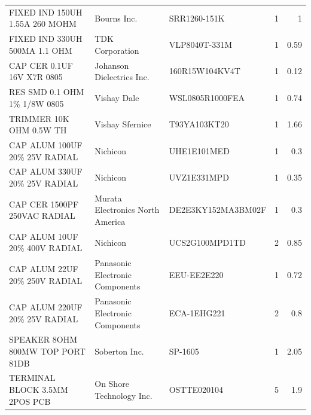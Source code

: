 \documentclass[journal,compsoc]{IEEEtran}
\begin{document}
\begin{table}[]
\begin{tabular}{|rrr|r|r|}
    \multicolumn{1}{|l}{FIXED IND 150UH 1.55A 260 MOHM} & \multicolumn{1}{l}{Bourns Inc.} & \multicolumn{1}{l}{SRR1260-151K} & \multicolumn{1}{r}{1} & 1 \\
    \multicolumn{1}{|l}{FIXED IND 330UH 500MA 1.1 OHM} & \multicolumn{1}{l}{TDK Corporation} & \multicolumn{1}{l}{VLP8040T-331M} & \multicolumn{1}{r}{1} & 0.59 \\
    \multicolumn{1}{|l}{CAP CER 0.1UF 16V X7R 0805} & \multicolumn{1}{l}{Johanson Dielectrics Inc.} & \multicolumn{1}{l}{160R15W104KV4T} & \multicolumn{1}{r}{1} & 0.12 \\
    \multicolumn{1}{|l}{RES SMD 0.1 OHM 1\% 1/8W 0805} & \multicolumn{1}{l}{ 
Vishay Dale} & \multicolumn{1}{l}{WSL0805R1000FEA} & \multicolumn{1}{r}{1} & 0.74 \\
    \multicolumn{1}{|l}{TRIMMER 10K OHM 0.5W TH} & \multicolumn{1}{l}{Vishay Sfernice} & \multicolumn{1}{l}{T93YA103KT20} & \multicolumn{1}{r}{1} & 1.66 \\
    \multicolumn{1}{|l}{CAP ALUM 100UF 20\% 25V RADIAL} & \multicolumn{1}{l}{Nichicon} & \multicolumn{1}{l}{UHE1E101MED} & \multicolumn{1}{r}{1} & 0.3 \\
    \multicolumn{1}{|l}{CAP ALUM 330UF 20\% 25V RADIAL} & \multicolumn{1}{l}{Nichicon} & \multicolumn{1}{l}{UVZ1E331MPD} & \multicolumn{1}{r}{1} & 0.35 \\
    \multicolumn{1}{|l}{CAP CER 1500PF 250VAC RADIAL} & \multicolumn{1}{l}{Murata Electronics North America} & \multicolumn{1}{l}{DE2E3KY152MA3BM02F} & \multicolumn{1}{r}{1} & 0.3 \\
    \multicolumn{1}{|l}{CAP ALUM 10UF 20\% 400V RADIAL} & \multicolumn{1}{l}{Nichicon} & \multicolumn{1}{l}{UCS2G100MPD1TD} & \multicolumn{1}{r}{2} & 0.85 \\
    \multicolumn{1}{|l}{CAP ALUM 22UF 20\% 250V RADIAL} & \multicolumn{1}{l}{Panasonic Electronic Components} & \multicolumn{1}{l}{EEU-EE2E220} & \multicolumn{1}{r}{1} & 0.72 \\
    \multicolumn{1}{|l}{CAP ALUM 220UF 20\% 25V RADIAL} & \multicolumn{1}{l}{Panasonic Electronic Components} & \multicolumn{1}{l}{ECA-1EHG221} & \multicolumn{1}{r}{2} & 0.8 \\
    \multicolumn{1}{|l}{SPEAKER 8OHM 800MW TOP PORT 81DB
} & \multicolumn{1}{l}{Soberton Inc.} & \multicolumn{1}{l}{SP-1605} & \multicolumn{1}{r}{1} & 2.05 \\
    \multicolumn{1}{|l}{TERMINAL BLOCK 3.5MM 2POS PCB} & \multicolumn{1}{l}{On Shore Technology Inc.} & \multicolumn{1}{l}{OSTTE020104} & \multicolumn{1}{r}{5} & 1.9 \\

\end{tabular}
\end{table}
\end{document}
